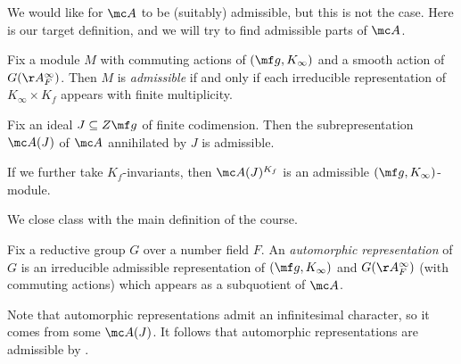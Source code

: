 \documentclass[../notes.tex]{subfiles}
\begin{document}
We would like for $\mc A$ to be (suitably) admissible, but this is not the case. Here is our target definition, and we will try to find admissible parts of $\mc A$.
\begin{definition}[admissible]
	Fix a module $M$ with commuting actions of $(\mf g,K_\infty)$ and a smooth action of $G(\AA_F^\infty)$. Then $M$ is \textit{admissible} if and only if each irreducible representation of $K_\infty\times K_f$ appears with finite multiplicity.
\end{definition}
\begin{theorem} \label{thm:automorphic-get-admissible}
	Fix an ideal $J\subseteq Z\mf g$ of finite codimension. Then the subrepresentation $\mc A(J)$ of $\mc A$ annihilated by $J$ is admissible.
\end{theorem}
\begin{example}
	If we further take $K_f$-invariants, then $\mc A(J)^{K_f}$ is an admissible $(\mf g,K_\infty)$-module.
\end{example}
We close class with the main definition of the course.
\begin{definition}
	Fix a reductive group $G$ over a number field $F$. An \textit{automorphic representation} of $G$ is an irreducible admissible representation of $(\mf g,K_\infty)$ and $G(\AA_F^\infty)$ (with commuting actions) which appears as a subquotient of $\mc A$.
\end{definition}
\begin{remark}
	Note that automorphic representations admit an infinitesimal character, so it comes from some $\mc A(J)$. It follows that automorphic representations are admissible by .
\end{remark}
\end{document}
